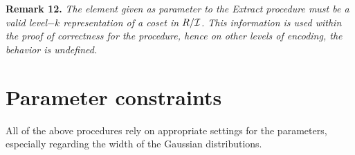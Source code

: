 \begin{enumerate}[label=(\alph*)]
\textbf{Remark 12.} \textit{The element given as parameter to the Extract procedure must be a valid level$-k$ representation of a coset in $R/\mathcal{I}$. This information is used within the proof of correctness for the procedure, hence on other levels of encoding, the behavior is undefined.}


\end{enumerate}

\section{Parameter constraints}

All of the above procedures rely on appropriate settings for the parameters, especially regarding the width of the Gaussian distributions. 

